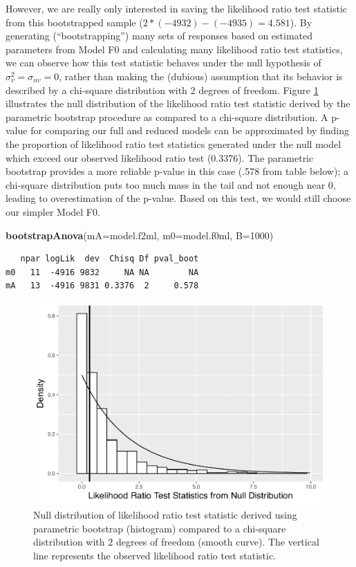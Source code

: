 \documentclass[
]{krantz}
\newenvironment{Shaded}{\begin{snugshade}}{\end{snugshade}}
\newcommand{\DataTypeTok}[1]{\textcolor[rgb]{0.27,0.27,0.27}{#1}}
\newcommand{\DecValTok}[1]{\textcolor[rgb]{0.06,0.06,0.06}{#1}}
\newcommand{\KeywordTok}[1]{\textcolor[rgb]{0.27,0.27,0.27}{\textbf{#1}}}
\newcommand{\NormalTok}[1]{#1}
\begin{document}
However, we are really only interested in saving the likelihood ratio test statistic from this bootstrapped sample (\(2*(-4932) - (-4935) = 4.581\)). By generating (``bootstrapping'') many sets of responses based on estimated parameters from Model F0 and calculating many likelihood ratio test statistics, we can observe how this test statistic behaves under the null hypothesis of \(\sigma_{v}^{2} = \sigma_{uv} = 0\), rather than making the (dubious) assumption that its behavior is described by a chi-square distribution with 2 degrees of freedom. Figure \ref{fig:paraboot9} illustrates the null distribution of the likelihood ratio test statistic derived by the parametric bootstrap procedure as compared to a chi-square distribution. A p-value for comparing our full and reduced models can be approximated by finding the proportion of likelihood ratio test statistics generated under the null model which exceed our observed likelihood ratio test (0.3376). The parametric bootstrap provides a more reliable p-value in this case (.578 from table below); a chi-square distribution puts too much mass in the tail and not enough near 0, leading to overestimation of the p-value. Based on this test, we would still choose our simpler Model F0.

\begin{Shaded}
\begin{Highlighting}[]
\KeywordTok{bootstrapAnova}\NormalTok{(}\DataTypeTok{mA=}\NormalTok{model.f2ml, }\DataTypeTok{m0=}\NormalTok{model.f0ml, }\DataTypeTok{B=}\DecValTok{1000}\NormalTok{)}
\end{Highlighting}
\end{Shaded}

\begin{verbatim}
   npar logLik  dev  Chisq Df pval_boot
m0   11  -4916 9832     NA NA        NA
mA   13  -4916 9831 0.3376  2     0.578
\end{verbatim}

\begin{figure}

{\centering \includegraphics[width=0.6\linewidth]{bookdown-BeyondMLR_files/figure-latex/paraboot9-1} 

}

\caption{Null distribution of likelihood ratio test statistic derived using parametric bootstrap (histogram) compared to a chi-square distribution with 2 degrees of freedom (smooth curve).  The vertical line represents the observed likelihood ratio test statistic.}\label{fig:paraboot9}
\end{figure}
\end{document}
